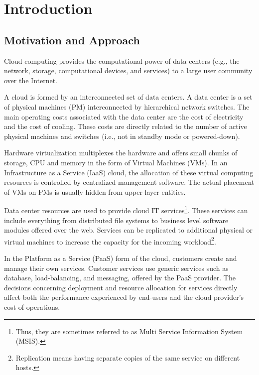 \chapter{Introduction}  
 \section{Motivation and Approach}   
 Cloud computing provides the computational power of data centers (e.g., the network, storage, computational devices, and services) to a large user community over the Internet. 

	 A cloud is formed by an interconnected set of data centers. 
  A data center is a set of physical machines (PM) interconnected by hierarchical network switches.
 The main operating costs associated with the data center are the cost of electricity and the cost of cooling.   
  These costs are directly related to the number of active physical machines and switches (i.e., not in standby mode or powered-down). %
 
 Hardware virtualization multiplexes the hardware and offers small chunks of storage, CPU and memory in the form of Virtual Machines (VMs). In an Infrastructure as a Service (IaaS) cloud, the allocation of these virtual computing resources is controlled by centralized management software. The actual placement of VMs on PMs is usually hidden from upper layer entities. 
 
   Data center resources are used to provide cloud IT services\footnote{Thus, they are sometimes referred to as Multi Service Information System (MSIS)\cite{li2011fast}.}. These services can include everything from distributed file systems to business level software modules offered over the web. 
Services can be replicated to additional physical or virtual machines to increase the capacity for the incoming workload\footnote{Replication means having separate copies of the same service on different hosts.}. 

 In the Platform as a Service (PaaS) form of the cloud, customers create and manage their own services.
 Customer services use generic services such as database, load-balancing, and messaging, offered by the PaaS provider. The decisions concerning deployment and resource allocation for services directly affect both the performance experienced by end-users and the cloud provider's cost of operations.

